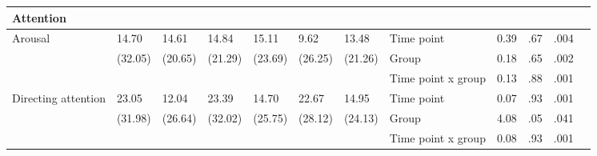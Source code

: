 \documentclass[authordate, empirical]{jote-new-article}
\begin{document}
\begin{table}[t]
\begin{fullwidth}
{\begin{tabular}{@{} l l l l l l l | l l l l l @{}}
        \textbf{Attention}                             &                                               &                      &                      &               &                                       &         &                    &       &      &      & \\

        \hline Arousal                                 & 14.70                                         & 14.61                & 14.84                & 15.11
                                                       & 9.62                                          & 13.48                & Time point           &
        0.39                                           & .67                                           & .004                                                                                                                                                       \\
                                                       & (32.05)                                       & (20.65)              & (21.29)              & (23.69)       & (26.25)                               & (21.26) & Group              & 0.18  & .65  & .002 & \\
                                                       &                                               &                      &                      &               &                                       &         & Time point x group & 0.13  & .88  & .001
        \\

        \hline Directing attention                     & 23.05                                         & 12.04                & 23.39                & 14.70         & 22.67                                 & 14.95   & Time point         & 0.07  & .93  & .001   \\
                                                       & (31.98)                                       & (26.64)              & (32.02)              & (25.75)       & (28.12)                               & (24.13) & Group              & 4.08  & .05  & .041   \\
                                                       &                                               &                      &                      &               &                                       &         & Time point x group & 0.08  & .93  & .001   \\


\end{tabular}}
\end{fullwidth}
\end{table}
\end{document}
